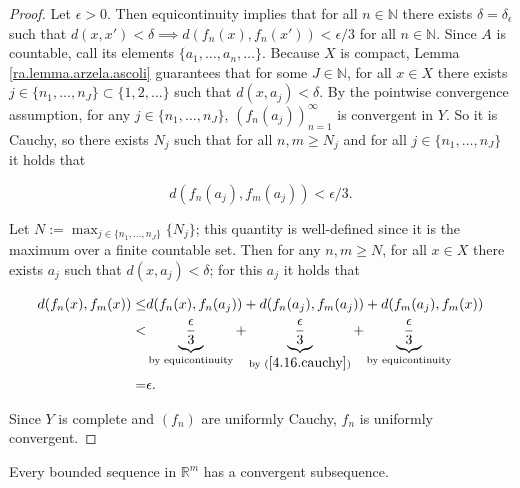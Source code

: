 \begin{proof}

Let \(\epsilon > 0\). Then equicontinuity implies that for all \(n \in \mathbb{N}\) there exists \(\delta = \delta_\epsilon\) such that \(d(x, x') < \delta \implies d(f_n(x), f_n(x')) < \epsilon/3\) for all \(n \in \mathbb{N}\). Since \(A\) is countable, call its elements \(\{a_1, \ldots, a_n, \ldots\}\). Because \(X\) is compact, Lemma \ref{ra.lemma.arzela.ascoli} guarantees that for some \(J \in \mathbb{N}\), for all \(x \in X\) there exists \(j \in \{n_1, \ldots, n_J\} \subset \{1, 2, \ldots\}\) such that \(d(x, a_j) < \delta\). By the pointwise convergence assumption, for any \(j \in \{n_1, \ldots, n_J\}\), \((f_n(a_j))_{n=1}^\infty\) is convergent in \(Y\). So it is Cauchy, so there exists \(N_j\) such that for all \(n, m \geq N_j\) and for all \(j \in \{n_1, \ldots, n_J\}\) it holds that 

\begin{equation}\label{4.16.cauchy}
d(f_n(a_j), f_m(a_j)) < \epsilon/3.
\end{equation}

Let \(N := \max_{j \in \{n_1, \ldots, n_J\}} \{N_j\}\); this quantity is well-defined since it is the maximum over a finite countable set. Then for any \(n, m \geq N\), for all \(x \in X\) there exists \(a_j\) such that \(d(x, a_j) < \delta\); for this \(a_j\) it holds that

\begin{align*}
d(f_n(x), f_m(x)) \leq  & d(f_n(x), f_n(a_j)) + d(f_n(a_j), f_m(a_j)) + d(f_m(a_j), f_m(x))
\\ < &  \underbrace{\frac{\epsilon}{3}}_{\text{by equicontinuity}} +  \underbrace{\frac{\epsilon}{3}}_{\text{by } (\ref{4.16.cauchy})} +  \underbrace{\frac{\epsilon}{3}}_{\text{by equicontinuity}} 
\\ = & \epsilon.
\end{align*}

Since \(Y\) is complete and \((f_n) \) are uniformly Cauchy, \(f_n\) is uniformly convergent.

\end{proof}

\begin{theorem}\label{ra.bolzano.weierstrass}

Every bounded sequence in \(\mathbb{R}^m\) has a convergent subsequence.

\end{theorem}

